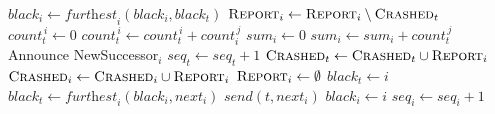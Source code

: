 \begin{appendices}
\begin{algorithm}[ht]
    $\textit{black}_i\leftarrow \textit{furthest}_i(\textit{black}_i,\textit{black}_t)$\;
    $\textit{\sc Report}_i\leftarrow\textit{\sc Report}_i\setminus\textit{\sc Crashed}_t$\;
    {
    $\textit{count}_t^{\,i}\leftarrow 0$\;
    {$\textit{count}_t^{\,i}\leftarrow \textit{count}_t^{\,i}+\textit{count}_i^{\,j}$\;}
    }
    {$\textit{sum}_i\leftarrow 0$\;
    {$\textit{sum}_i\leftarrow \textit{sum}_i+\textit{count}_t^{\,j}$\;}
    {{\rm Announce}\;}}
    {NewSuccessor$_i$\;}
    {$\textit{seq}_t\leftarrow\textit{seq}_t+1$\;}
    {
    $\textit{\sc Crashed}_t\leftarrow\textit{\sc Crashed}_t\cup\textit{\sc Report}_i$\;
    $\textit{\sc Crashed}_i\leftarrow\textit{\sc Crashed}_i\cup\textit{\sc Report}_i$\;
    $\textit{\sc Report}_i\leftarrow\emptyset$\;
    $\textit{black}_t\leftarrow i$\;
    }
    {
    $\textit{black}_t\leftarrow\textit{furthest}_i(\textit{black}_i,\textit{next}_i)$\;
    }
    $\textit{send}(t, \textit{next}_i)$\;
    $\textit{black}_i \leftarrow i$\;
    $\textit{seq}_i\leftarrow\textit{seq}_i+1$\;
\end{algorithm}


\end{appendices}